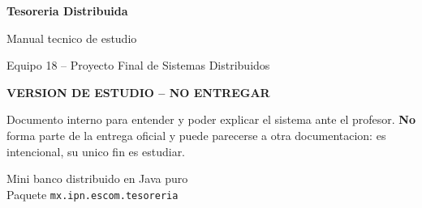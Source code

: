 \documentclass[11pt,a4paper]{article}
\newcommand{\pendiente}[1]{{\color{red}\textbf{[PENDIENTE: #1]}}}
\newcommand{\codigo}[1]{\texttt{#1}}
\begin{document}
\begin{titlepage}
\centering
\vspace*{3cm}
{\Huge\bfseries Tesoreria Distribuida\par}
\vspace{0.6cm}
{\Large Manual tecnico de estudio\par}
\vspace{0.3cm}
{\large Equipo 18 -- Proyecto Final de Sistemas Distribuidos\par}
\vspace{2.5cm}
{\large\bfseries\color{red}VERSION DE ESTUDIO -- NO ENTREGAR\par}
\vspace{0.4cm}
\begin{minipage}{0.8\textwidth}\centering\normalsize
Documento interno para entender y poder explicar el sistema ante el
profesor. \textbf{No} forma parte de la entrega oficial y puede parecerse
a otra documentacion: es intencional, su unico fin es estudiar.
\end{minipage}
\vfill
{\normalsize Mini banco distribuido en Java puro\\ Paquete \codigo{mx.ipn.escom.tesoreria}\par}
\end{titlepage}

\tableofcontents
\newpage












\end{document}
